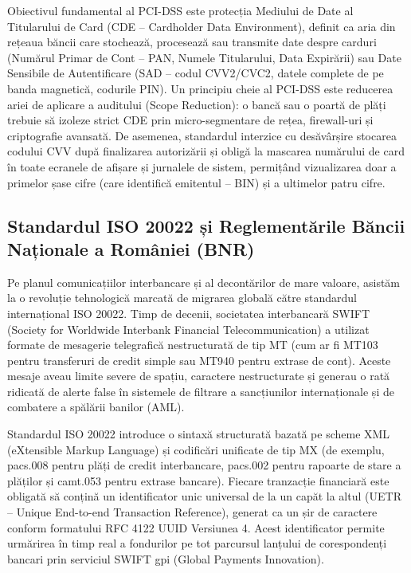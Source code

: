 Obiectivul fundamental al PCI-DSS este protecția Mediului de Date al Titularului de Card (CDE – Cardholder Data Environment), definit ca aria din rețeaua băncii care stochează, procesează sau transmite date despre carduri (Numărul Primar de Cont – PAN, Numele Titularului, Data Expirării) sau Date Sensibile de Autentificare (SAD – codul CVV2/CVC2, datele complete de pe banda magnetică, codurile PIN). Un principiu cheie al PCI-DSS este reducerea ariei de aplicare a auditului (Scope Reduction): o bancă sau o poartă de plăți trebuie să izoleze strict CDE prin micro-segmentare de rețea, firewall-uri și criptografie avansată. De asemenea, standardul interzice cu desăvârșire stocarea codului CVV după finalizarea autorizării și obligă la mascarea numărului de card în toate ecranele de afișare și jurnalele de sistem, permițând vizualizarea doar a primelor șase cifre (care identifică emitentul – BIN) și a ultimelor patru cifre.

\subsection{Standardul ISO 20022 și Reglementările Băncii Naționale a României (BNR)}

Pe planul comunicațiilor interbancare și al decontărilor de mare valoare, asistăm la o revoluție tehnologică marcată de migrarea globală către standardul internațional ISO 20022. Timp de decenii, societatea interbancară SWIFT (Society for Worldwide Interbank Financial Telecommunication) a utilizat formate de mesagerie telegrafică nestructurată de tip MT (cum ar fi MT103 pentru transferuri de credit simple sau MT940 pentru extrase de cont). Aceste mesaje aveau limite severe de spațiu, caractere nestructurate și generau o rată ridicată de alerte false în sistemele de filtrare a sancțiunilor internaționale și de combatere a spălării banilor (AML).

Standardul ISO 20022 introduce o sintaxă structurată bazată pe scheme XML (eXtensible Markup Language) și codificări unificate de tip MX (de exemplu, pacs.008 pentru plăți de credit interbancare, pacs.002 pentru rapoarte de stare a plăților și camt.053 pentru extrase bancare). Fiecare tranzacție financiară este obligată să conțină un identificator unic universal de la un capăt la altul (UETR – Unique End-to-end Transaction Reference), generat ca un șir de caractere conform formatului RFC 4122 UUID Versiunea 4. Acest identificator permite urmărirea în timp real a fondurilor pe tot parcursul lanțului de corespondenți bancari prin serviciul SWIFT gpi (Global Payments Innovation).

